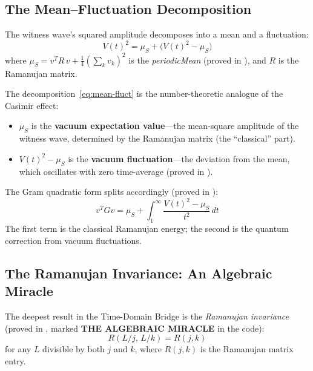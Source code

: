 \subsection{The Mean--Fluctuation Decomposition}

The witness wave's squared amplitude decomposes into a mean and a
fluctuation:
\begin{equation}
  V(t)^2 = \mu_S + \bigl(V(t)^2 - \mu_S\bigr)
  \label{eq:mean-fluct}
\end{equation}
where $\mu_S = v^T R\, v + \tfrac{1}{4}(\sum_k v_k)^2$ is the
\emph{periodicMean} (proved in ), and $R$ is the
Ramanujan matrix.

\begin{correspondence}
The decomposition~\eqref{eq:mean-fluct} is the number-theoretic
analogue of the Casimir effect:
\begin{itemize}
  \item $\mu_S$ is the \textbf{vacuum expectation value}---the
    mean-square amplitude of the witness wave, determined by the
    Ramanujan matrix (the ``classical'' part).
  \item $V(t)^2 - \mu_S$ is the \textbf{vacuum fluctuation}---the
    deviation from the mean, which oscillates with zero time-average
    (proved in ).
\end{itemize}
The Gram quadratic form splits accordingly
(proved in ):
\[
  v^T G v = \mu_S + \int_1^{\infty}
  \frac{V(t)^2 - \mu_S}{t^2}\,dt
\]
The first term is the classical Ramanujan energy; the second is the
quantum correction from vacuum fluctuations.
\end{correspondence}

\subsection{The Ramanujan Invariance: An Algebraic Miracle}

The deepest result in the Time-Domain Bridge is the
\emph{Ramanujan invariance} (proved in ,
marked \textbf{THE ALGEBRAIC MIRACLE} in the code):
\begin{equation}
  R(L/j,\, L/k) = R(j, k)
  \label{eq:ramanujan-invariance}
\end{equation}
for any $L$ divisible by both $j$ and $k$, where $R(j,k)$ is the
Ramanujan matrix entry.

